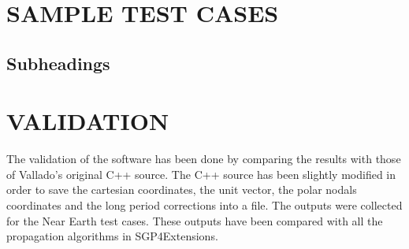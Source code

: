 \documentclass{article}
\begin{document}




\section{SAMPLE TEST CASES}
\label{sec:sampletestcases}


\subsection{Subheadings}
\label{ssec:subhead}



\section{VALIDATION}
\label{sec:validation}

The validation of the software has been done by comparing the results with those
of Vallado's original C++ source. The C++ source has been slightly modified in order
to save the cartesian coordinates, the unit vector, the polar nodals coordinates
and the long period corrections into a file. The outputs were collected
for the Near Earth test cases. These outputs have been compared with all the propagation
algorithms in SGP4Extensions.
\end{document}
